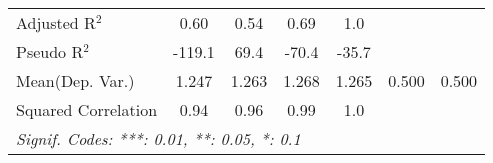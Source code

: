 \begin{tabular}{lcccccc}
   Adjusted R$^2$                                             & 0.60           & 0.54       & 0.69          & 1.0       &     & \\  
   Pseudo R$^2$                                               & -119.1         & 69.4       & -70.4         & -35.7     &     & \\  
Mean(Dep. Var.) & 1.247 & 1.263 & 1.268 & 1.265 & 0.500 & 0.500 \\
   Squared Correlation                                        & 0.94           & 0.96       & 0.99          & 1.0       &     & \\  
   \midrule \midrule
   \multicolumn{7}{l}{\emph{Signif. Codes: ***: 0.01, **: 0.05, *: 0.1}}\\
\end{tabular}
\par\endgroup
